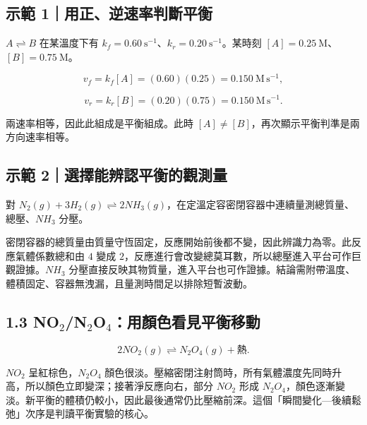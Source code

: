 \documentclass[11pt,a4paper]{article}
\begin{document}
\begin{HandoutWorkedExample}

\subsection{示範 1｜用正、逆速率判斷平衡}\label{ux793aux7bc4-1ux7528ux6b63ux9006ux901fux7387ux5224ux65b7ux5e73ux8861}

\(A\rightleftharpoons B\) 在某溫度下有 \(k_f=0.60\ \mathrm{s^{-1}}\)、\(k_r=0.20\ \mathrm{s^{-1}}\)。某時刻 \([A]=0.25\ \mathrm M\)、\([B]=0.75\ \mathrm M\)。

\[
v_f=k_f[A]=(0.60)(0.25)=0.150\ \mathrm{M\,s^{-1}},
\]

\[
v_r=k_r[B]=(0.20)(0.75)=0.150\ \mathrm{M\,s^{-1}}.
\]

兩速率相等，因此此組成是平衡組成。此時 \([A]\ne[B]\)，再次顯示平衡判準是兩方向速率相等。

\end{HandoutWorkedExample}

\begin{HandoutWorkedExample}

\subsection{示範 2｜選擇能辨認平衡的觀測量}\label{ux793aux7bc4-2ux9078ux64c7ux80fdux8fa8ux8a8dux5e73ux8861ux7684ux89c0ux6e2cux91cf}

對 \(N_2(g)+3H_2(g)\rightleftharpoons2NH_3(g)\)，在定溫定容密閉容器中連續量測總質量、總壓、\(NH_3\) 分壓。

密閉容器的總質量由質量守恆固定，反應開始前後都不變，因此辨識力為零。此反應氣體係數總和由 \(4\) 變成 \(2\)，反應進行會改變總莫耳數，所以總壓進入平台可作巨觀證據。\(NH_3\) 分壓直接反映其物質量，進入平台也可作證據。結論需附帶溫度、體積固定、容器無洩漏，且量測時間足以排除短暫波動。

\end{HandoutWorkedExample}

\subsection{\texorpdfstring{1.3 NO\(_2\)/N\(_2\)O\(_4\)：用顏色看見平衡移動}{1.3 NO\_2/N\_2O\_4：用顏色看見平衡移動}}\label{no_2n_2o_4ux7528ux984fux8272ux770bux898bux5e73ux8861ux79fbux52d5}

\[
2NO_2(g)\rightleftharpoons N_2O_4(g)+\text{熱}.
\]

\(NO_2\) 呈紅棕色，\(N_2O_4\) 顏色很淡。壓縮密閉注射筒時，所有氣體濃度先同時升高，所以顏色立即變深；接著淨反應向右，部分 \(NO_2\) 形成 \(N_2O_4\)，顏色逐漸變淡。新平衡的體積仍較小，因此最後通常仍比壓縮前深。這個「瞬間變化---後續鬆弛」次序是判讀平衡實驗的核心。
\end{document}
